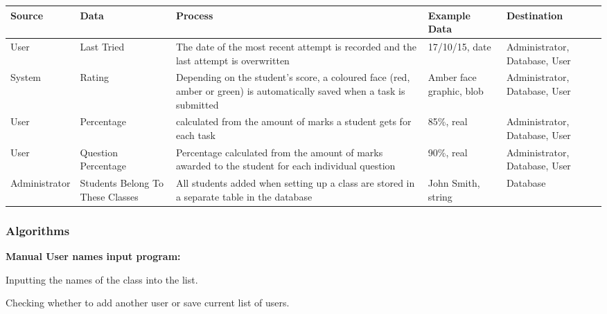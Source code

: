 \begin{center}
\begin{tabular}{|p{2.5cm}|p{2.5cm}|p{2.5cm}|p{2.5cm}|p{2.5cm}|}
\hline
\textbf{Source} & \textbf{Data} & \textbf{Process} & \textbf{Example Data} & \textbf{Destination} \\ \hline
User & Last Tried & The date of the most recent attempt is recorded and the last attempt is overwritten & 17/10/15, date & Administrator, Database, User \\ \hline
System & Rating & Depending on the student's score, a coloured face (red, amber or green) is automatically saved when a task is submitted & Amber face graphic, blob & Administrator, Database, User \\ \hline
User & Percentage & calculated from the amount of marks a student gets for each task & 85\%, real & Administrator, Database, User \\ \hline
User & Question Percentage & Percentage calculated from the amount of marks awarded to the student for each individual question & 90\%, real & Administrator, Database, User \\ \hline
Administrator & Students Belong To These Classes & All students added when setting up a class are stored in a separate table in the database & John Smith, string & Database \\ \hline
\end{tabular}
\end{center}

\subsubsection{Algorithms}

\textbf{Manual User names input program:}

\begin{algorithm}[H]
\caption{Inputting the names of the class into the list.}
\begin{algorithmic}[1]
\end{algorithmic}
\end{algorithm}

\begin{algorithm}[H]
\caption{Checking whether to add another user or save current list of users.}
\begin{algorithmic}[1]
\Else{}
\EndIf
\end{algorithmic}
\end{algorithm}

